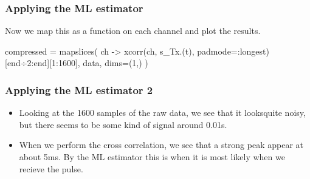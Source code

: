 \documentclass[compress]{beamer}
\begin{document}
\begin{frame}[fragile] %
    \frametitle{Applying the ML estimator}
    Now we map this as a function on each channel and plot the results.
    \begin{jllisting}[gobble=8]
        compressed = mapslices(
            ch -> xcorr(ch, s_Tx.(t), padmode=:longest)[end÷2:end][1:1600], 
            data, dims=(1,)
        )
    \end{jllisting}
    \begin{figure}
        \centering
        \begin{subfigure}{0.5\textwidth}
            \centering
            
        \end{subfigure}%
        \begin{subfigure}{0.5\textwidth}
            \centering
            
        \end{subfigure}
    \end{figure}
\end{frame}

\begin{frame} %
    \frametitle{Applying the ML estimator 2}
    \begin{itemize}
        \item Looking at the 1600 samples of the raw data, we see that it looksquite noisy,
            but there seems to be some kind of signal around 0.01s. 

        \item When we perform the cross correlation, we see that a strong peak appear at
            about 5ms. By the ML estimator this is when it is most likely when we
            recieve the pulse.
    \end{itemize}
\end{frame} %
\end{document}
